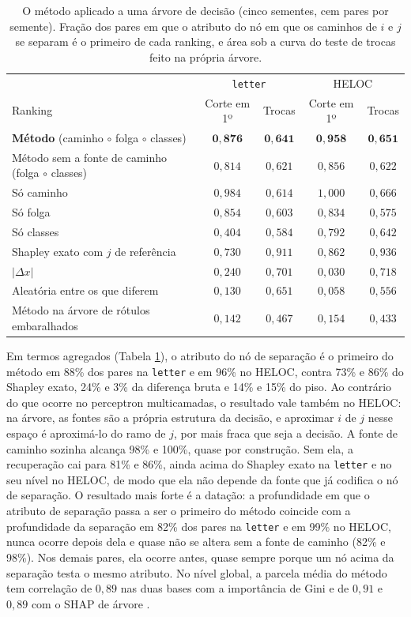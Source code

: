 \begin{table}[pos=htbp]
\centering
\caption{O método aplicado a uma árvore de decisão (cinco sementes, cem pares por semente). Fração dos pares em que o atributo do nó em que os caminhos de $i$ e $j$ se separam é o primeiro de cada ranking, e área sob a curva do teste de trocas feito na própria árvore.}
\label{tab:res_arvore}
\footnotesize
\setlength{\tabcolsep}{4pt}
\begin{tabular}{l c c c c}
\hline
 & \multicolumn{2}{c}{\texttt{letter}} & \multicolumn{2}{c}{HELOC} \\
Ranking & Corte em 1º & Trocas & Corte em 1º & Trocas \\
\hline
\textbf{Método} (caminho $\circ$ folga $\circ$ classes) & $\mathbf{0{,}876}$ & $\mathbf{0{,}641}$ & $\mathbf{0{,}958}$ & $\mathbf{0{,}651}$ \\
Método sem a fonte de caminho (folga $\circ$ classes) & $0{,}814$ & $0{,}621$ & $0{,}856$ & $0{,}622$ \\
Só caminho & $0{,}984$ & $0{,}614$ & $1{,}000$ & $0{,}666$ \\
Só folga & $0{,}854$ & $0{,}603$ & $0{,}834$ & $0{,}575$ \\
Só classes & $0{,}404$ & $0{,}584$ & $0{,}792$ & $0{,}642$ \\
Shapley exato com $j$ de referência & $0{,}730$ & $0{,}911$ & $0{,}862$ & $0{,}936$ \\
$|\Delta x|$ & $0{,}240$ & $0{,}701$ & $0{,}030$ & $0{,}718$ \\
Aleatória entre os que diferem & $0{,}130$ & $0{,}651$ & $0{,}058$ & $0{,}556$ \\
Método na árvore de rótulos embaralhados & $0{,}142$ & $0{,}467$ & $0{,}154$ & $0{,}433$ \\
\hline
\end{tabular}
\end{table}

Em termos agregados (Tabela \ref{tab:res_arvore}), o atributo do nó de separação é o primeiro do método em 88\% dos pares na \texttt{letter} e em 96\% no HELOC, contra 73\% e 86\% do Shapley exato, 24\% e 3\% da diferença bruta e 14\% e 15\% do piso. Ao contrário do que ocorre no perceptron multicamadas, o resultado vale também no HELOC: na árvore, as fontes são a própria estrutura da decisão, e aproximar $i$ de $j$ nesse espaço é aproximá-lo do ramo de $j$, por mais fraca que seja a decisão. A fonte de caminho sozinha alcança 98\% e 100\%, quase por construção. Sem ela, a recuperação cai para 81\% e 86\%, ainda acima do Shapley exato na \texttt{letter} e no seu nível no HELOC, de modo que ela não depende da fonte que já codifica o nó de separação. O resultado mais forte é a datação: a profundidade em que o atributo de separação passa a ser o primeiro do método coincide com a profundidade da separação em 82\% dos pares na \texttt{letter} e em 99\% no HELOC, nunca ocorre depois dela e quase não se altera sem a fonte de caminho (82\% e 98\%). Nos demais pares, ela ocorre antes, quase sempre porque um nó acima da separação testa o mesmo atributo. No nível global, a parcela média do método tem correlação de $0{,}89$ nas duas bases com a importância de Gini e de $0{,}91$ e $0{,}89$ com o SHAP de árvore \citep{Lundberg2020}.

